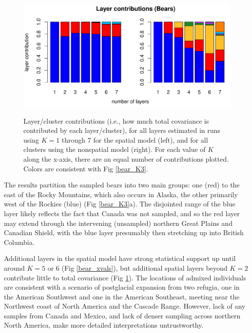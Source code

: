 \documentclass[10pt,letterpaper]{article}
\begin{document}
\begin{figure}
	\centering
		{\includegraphics[width=\textwidth]{figs/bears/bears_laycon_barplots.pdf}}
	\caption{
	Layer/cluster contributions (i.e., how much total covariance is contributed by each layer/cluster), 
	for all layers estimated in runs using $K = 1$ through 7 
	for the spatial model (left),
	and for all clusters using the nonspatial model (right).
	For each value of $K$ along the x-axis, there are an equal number of contributions plotted.
	Colors are consistent with Fig \ref{bear_K3}.
    }\label{bear_laycon}
\end{figure}

The results partition the sampled bears into two main groups:
one (red) to the east of the Rocky Mountains, 
which also occurs in Alaska,
the other primarily west of the Rockies (blue)  (Fig \ref{bear_K3}a).
The disjointed range of the blue layer likely reflects the fact
that Canada was not sampled, 
and so the red layer may extend
through the intervening (unsampled) northern Great Plains and Canadian Shield, 
with the blue layer presumably then stretching up into British Columbia.

Additional layers in the spatial model have strong statistical support 
up until around $K=5$ or 6 (Fig \ref{bear_xvals}),
but additional spatial layers beyond $K=2$ contribute little to total covariance (Fig \ref{bear_laycon}).
The locations of admixed individuals 
are consistent with a scenario of postglacial expansion from two refugia, 
one in the American Southwest and one in the American Southeast, 
meeting near the Northwest coast of North America and the Cascade Range.
However, lack of any samples from Canada and Mexico, 
and lack of denser sampling across northern North America, 
make more detailed interpretations untrustworthy.
\end{document}

